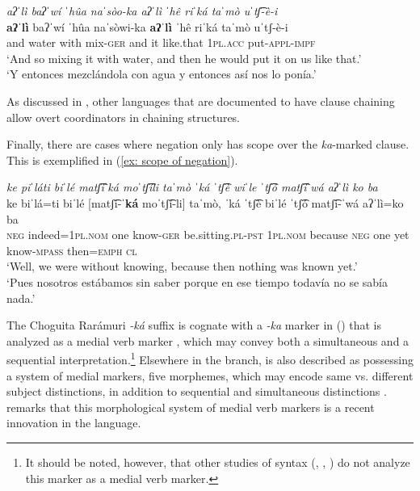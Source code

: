 
\ea\label{ex: overt coordinator ka clauses}

\textit{aʔˈlì baʔˈwí ˈhûa naˈsòo-ka aʔˈlì ˈhê riˈká taˈmò uˈtʃ͡-è-i}\\
\gll    \textbf{aʔˈlì} baʔˈwí ˈhûa naˈsòwi-ka \textbf{aʔˈlì} ˈhê riˈká taˈmò uˈtʃ-è-i\\
       {and} water with mix-\textsc{ger} {and} it like.that \textsc{1pl.acc} put-\textsc{appl-impf}\\
\glt    `And so mixing it with water, and then he would put it on us like that.'\\
\glt    `Y entonces mezclándola con agua y entonces así nos lo ponía.'    \\

\z

As discussed in \citet{toosarvandani2021chaining}, other  languages that are documented to have clause chaining allow overt coordinators in chaining structures.

Finally, there are cases where negation only has scope over the \textit{ka}-marked clause. This is exemplified in (\ref{ex: scope of negation}).

\ea\label{ex: scope of negation}

\textit{ke piˈláti biˈlé matʃ͡iˈká moˈtʃ͡íli taˈmò ˈká ˈtʃ͡è wiˈle ˈtʃ͡ó matʃ͡iˈwá aʔˈlì ko ba}\\
\gll    ke biˈlá=ti biˈlé [matʃ͡i-\textbf{ˈká} moˈtʃ͡í-li] taˈmò, ˈká ˈtʃ͡è biˈlé ˈtʃ͡ó matʃ͡i-ˈwá aʔˈlì=ko ba\\
        \textsc{neg} indeed=\textsc{1pl.nom} one know-\textsc{{ger}} be.sitting.\textsc{pl-pst} \textsc{1pl.nom} because \textsc{neg} one yet know-\textsc{mpass} then\textsc{=emph} \textsc{cl}\\
\glt    `Well, we were without knowing, because then nothing was known yet.'\\
\glt    `Pues nosotros estábamos sin saber porque en ese tiempo todavía no se sabía nada.' \\

\z

The Choguita Rarámuri \textit{-ká} suffix is cognate with a \textit{-ka} marker in  () that is analyzed as a medial verb marker \citep{fabian2006yaqui}, which may convey both a simultaneous and a sequential interpretation.\footnote{It should be noted, however, that other studies of  syntax (\citealt{dedrick1999sonora}, \citealt{guerrero2004yaqui}, \citealt{guerrero2019fenomeno}) do not analyze this marker as a medial verb marker.} Elsewhere in the  branch,  is also described as possessing a system of medial markers, five morphemes, which may encode same vs. different subject distinctions, in addition to sequential and simultaneous distinctions \citep[200]{miller1996guarijio}. \citet{miller1996guarijio} remarks that this morphological system of medial verb markers is a recent innovation in the language.


